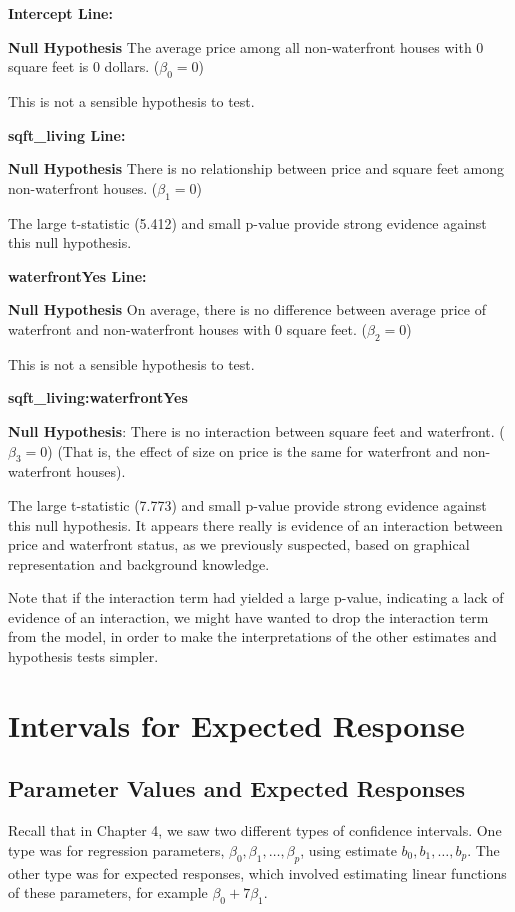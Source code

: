 \documentclass[
  letterpaper,
  DIV=11,
  numbers=noendperiod]{scrreprt}
\begin{document}
\textbf{Intercept Line:}

\textbf{Null Hypothesis} The average price among all non-waterfront
houses with 0 square feet is 0 dollars. (\(\beta_0=0\))

This is not a sensible hypothesis to test.

\textbf{sqft\_living Line:}

\textbf{Null Hypothesis} There is no relationship between price and
square feet among non-waterfront houses. (\(\beta_1=0\))

The large t-statistic (5.412) and small p-value provide strong evidence
against this null hypothesis.

\textbf{waterfrontYes Line:}

\textbf{Null Hypothesis} On average, there is no difference between
average price of waterfront and non-waterfront houses with 0 square
feet. (\(\beta_2=0\))

This is not a sensible hypothesis to test.

\textbf{sqft\_living:waterfrontYes}

\textbf{Null Hypothesis}: There is no interaction between square feet
and waterfront. (\(\beta_3=0\)) (That is, the effect of size on price is
the same for waterfront and non-waterfront houses).

The large t-statistic (7.773) and small p-value provide strong evidence
against this null hypothesis. It appears there really is evidence of an
interaction between price and waterfront status, as we previously
suspected, based on graphical representation and background knowledge.

Note that if the interaction term had yielded a large p-value,
indicating a lack of evidence of an interaction, we might have wanted to
drop the interaction term from the model, in order to make the
interpretations of the other estimates and hypothesis tests simpler.

\section{Intervals for Expected
Response}\label{intervals-for-expected-response}

\subsection{Parameter Values and Expected
Responses}\label{parameter-values-and-expected-responses}

Recall that in Chapter 4, we saw two different types of confidence
intervals. One type was for regression parameters,
\(\beta_0, \beta_1, \ldots, \beta_p\), using estimate
\(b_0, b_1, \ldots, b_p\). The other type was for expected responses,
which involved estimating linear functions of these parameters, for
example \(\beta_0 + 7\beta_1\).
\end{document}
